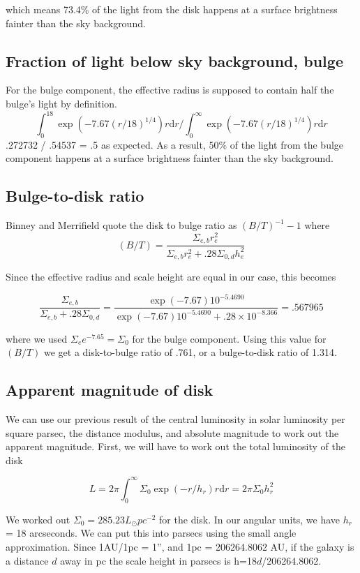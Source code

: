 \documentclass[12pt]{article}
\begin{document}
which means 73.4\% of the light from the disk happens at a surface brightness fainter than the sky background.

\subsection{Fraction of light below sky background, bulge}
For the bulge component, the effective radius is supposed to contain half the bulge's light by definition.
$$  \int^{18}_{0} \exp(-7.67(r/18)^{1/4}) r \mathrm{d}r / \int^{\infty}_{0} \exp(-7.67(r/18)^{1/4}) r \mathrm{d}r $$
.272732 / .54537 = .5 as expected. As a result, 50\% of the light from the bulge component happens at a surface brightness fainter than the sky background.

\subsection{Bulge-to-disk ratio}
Binney and Merrifield quote the disk to bulge ratio as $(B/T)^{-1} -1$ where $$(B/T) = \frac{\Sigma_{e,b} r_{e}^{2}}{\Sigma_{e,b} r_{e}^{2} + .28 \Sigma_{0,d}h_{e}^2 }$$

Since the effective radius and scale height are equal in our case, this becomes 

$$\frac{\Sigma_{e,b}}{\Sigma_{e,b}  + .28 \Sigma_{0,d}} = \frac{\exp(-7.67)10^{-5.4690}}{\exp(-7.67)10^{-5.4690}  + .28 \times10^{-8.366}} = .567965$$

where we used $\Sigma_{e}e^{-7.65} = \Sigma_{0}$ for the bulge component. Using this value for $(B/T)$ we get a disk-to-bulge ratio of .761, or a bulge-to-disk ratio of 1.314.

\subsection{Apparent magnitude of disk}
We can use our previous result of the central luminosity in solar luminosity per square parsec, the distance modulus, and absolute magnitude to work out the apparent magnitude. First, we will have to work out the total luminosity of the disk

$$L = 2\pi \int^{\infty}_{0} \Sigma_{0}\exp(-r/h_{r}) r\mathrm{d}r = 2\pi \Sigma_{0}h_{r}^{2} $$

We worked out $\Sigma_{0} =  285.23 L_{\odot} pc^{-2}$ for the disk. In our angular units, we have $h_{r}$ = 18 arcseconds. We can put this into parsecs using the small angle approximation. Since 1AU/1pc = 1'', and 1pc = 206264.8062 AU, if the galaxy is a distance $d$ away in pc the scale height in parsecs is h=18$d$/206264.8062.
\end{document}
